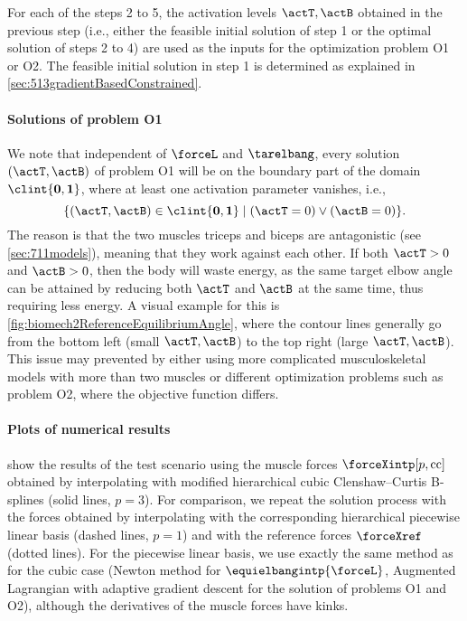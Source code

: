 %
For each of the steps 2 to 5, the activation levels $\actT, \actB$ obtained
in the previous step (i.e., either the feasible initial solution
of step 1 or the optimal solution of steps 2 to 4) are used
as the inputs for the optimization problem O1 or O2.
The feasible initial solution in step 1 is determined as explained
in \cref{sec:513gradientBasedConstrained}.

\paragraph{Solutions of problem O1}

We note that independent of $\forceL$ and $\tarelbang$,
every solution $(\actT, \actB)$ of problem O1 will be
on the boundary part of the domain $\clint{\*0, \*1}$,
where at least one activation parameter vanishes, i.e.,
\begin{equation}
  \{(\actT, \actB) \in \clint{\*0, \*1} \mid
  (\actT = 0) \lor (\actB = 0)\}.
\end{equation}
The reason is that the two muscles triceps and biceps are antagonistic
(see \cref{sec:711models}), meaning that they work against each other.
If both $\actT > 0$ and $\actB > 0$, then the body will waste energy,
as the same target elbow angle can be attained by reducing both
$\actT$ and $\actB$ at the same time, thus requiring less energy.
A visual example for this is \cref{fig:biomech2ReferenceEquilibriumAngle},
where the contour lines generally go from the bottom left
(small $\actT, \actB$) to the top right (large $\actT, \actB$).
This issue may prevented by either
using more complicated musculoskeletal models with more
than two muscles or different optimization problems
such as problem O2, where the objective function differs.

\paragraph{Plots of numerical results}

show the results of the test scenario using the muscle forces
$\forceXintp[p,\cc]$ obtained by interpolating with
modified hierarchical cubic Clenshaw--Curtis B-splines (solid lines, $p = 3$).
For comparison, we repeat the solution process
with the forces obtained by interpolating with the
corresponding hierarchical piecewise linear basis (dashed lines, $p = 1$) and
with the reference forces $\forceXref$ (dotted lines).
For the piecewise linear basis,
we use exactly the same method as for the cubic case
(Newton method for $\equielbangintp{\forceL}$,
Augmented Lagrangian with adaptive gradient descent for the
solution of problems O1 and O2),
although the derivatives of the muscle forces have kinks.

